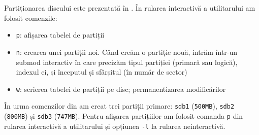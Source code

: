 Partiționarea discului este prezentată în .
În rularea interactivă a utilitarului  am folosit comenzile:
\begin{itemize}
  \item \texttt{p}: afișarea tabelei de partiții
  \item \texttt{n}: crearea unei partiții noi. Când creăm o partiție nouă, intrăm într-un submod interactiv în care precizăm tipul partiției (primară sau logică), indexul ei, și începutul și sfârșitul (în număr de sector)
  \item \texttt{w}: scrierea tabelei de partiții pe disc; permanentizarea modificărilor
\end{itemize}

În urma comenzilor din  am creat trei partiții primare: \texttt{sdb1} (\texttt{500MB}), \texttt{sdb2} (\texttt{800MB}) și \texttt{sdb3} (\texttt{747MB}).
Pentru afișarea partițiilor am folosit comanda \texttt{p} din rularea interactivă a utilitarului  și opțiunea \texttt{-l} la rularea neinteractivă.

